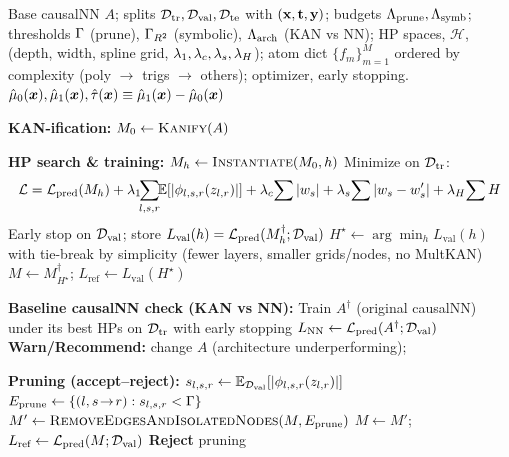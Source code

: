 \begin{algorithm}[t]
\caption{\Our: Interpretable CATE via KAN-ified causal networks}
\label{alg:causalkan}
\begin{algorithmic}[1]
\small
\Require Base causalNN $A$; splits $\mathcal{D}_{\text{tr}},\mathcal{D}_{\text{val}},\mathcal{D}_{\text{te}}$ with $({\mathbf{x}},{\mathbf{t}},{\mathbf{y}})$; budgets $\Lambda_{\text{prune}}, \Lambda_{\text{symb}}$; thresholds $\Gamma$ (prune), $\Gamma_{R^2}$ (symbolic), $\Lambda_{\text{arch}}$ (KAN vs NN); HP spaces, $\mathcal{H}$, (depth, width, spline grid, $\lambda_1,\lambda_c,\lambda_s,\lambda_H$); atom dict $\{f_m\}_{m=1}^M$ ordered by complexity (poly $\to$ trigs $\to$ others); optimizer, early stopping.
\Ensure $\hat{\mu}_0({\bm{x}}), \hat{\mu}_1({\bm{x}}), \hat{\tau}({\bm{x}}) \equiv \hat{\mu}_1({\bm{x}})-\hat{\mu}_0({\bm{x}})$
\Statex

\State \textbf{KAN-ification:} $M_0 \gets \textsc{Kanify}(A)$
\Statex

\State \textbf{HP search \& training:}
  \State $M_h \gets \textsc{Instantiate}(M_0,h)$
  \State Minimize on $\mathcal{D}_{\text{tr}}$:
  \[
    \Loss=\Loss_{\text{pred}}(M_h)
    + \weight_1 \!\!\sum_{\indexlayer,\indexsix,\indexfive}\!\! \mathbb{E}\!\left[\left|\kanlayer_{\indexlayer,\indexsix,\indexfive}(\samplekan_{\indexlayer,\indexfive})\right|\right]
    + \weight_c \!\sum |\splinecoef| + \weight_s \!\sum |\splinecoef-\splinecoef'|
    + \weight_H \!\sum H
  \]
  \State Early stop on $\mathcal{D}_{\text{val}}$; store $L_{\text{val}}(h)=\mathcal{L}_{\text{pred}}(M_h^\dagger;\mathcal{D}_{\text{val}})$
\EndFor
\State $H^\star \gets \arg\min_h L_{\text{val}}(h)$ with tie-break by simplicity (fewer layers, smaller grids/nodes, no MultKAN)
\State $M \gets M_{H^\star}^\dagger$; \quad $L_{\text{ref}} \gets L_{\text{val}}(H^\star)$
\Statex

\State \textbf{Baseline causalNN check (KAN vs NN):}
\State Train $A^\dagger$ (original causalNN) under its best HPs on $\mathcal{D}_{\text{tr}}$ with early stopping
\State $L_{\text{NN}} \gets \mathcal{L}_{\text{pred}}(A^\dagger;\mathcal{D}_{\text{val}})$
  \State \textbf{Warn/Recommend:} change $A$ (architecture underperforming);
\EndIf
\Statex

\State \textbf{Pruning (accept--reject):}
\State $s_{l,s,r} \gets \mathbb{E}_{\mathcal{D}_{\text{val}}}\!\left[\left|\phi_{l,s,r}(z_{l,r})\right|\right]$
\State $E_{\text{prune}} \gets \{(l,s\!\to\!r): s_{l,s,r}<\Gamma\}$
  \State $M' \gets \textsc{RemoveEdgesAndIsolatedNodes}(M,E_{\text{prune}})$
   \State $M\gets M'$; $L_{\text{ref}}\gets \mathcal{L}_{\text{pred}}(M;\mathcal{D}_{\text{val}})$ \Else \State \textbf{Reject} pruning \EndIf
\EndIf
\Statex


\end{algorithmic}
\end{algorithm}
